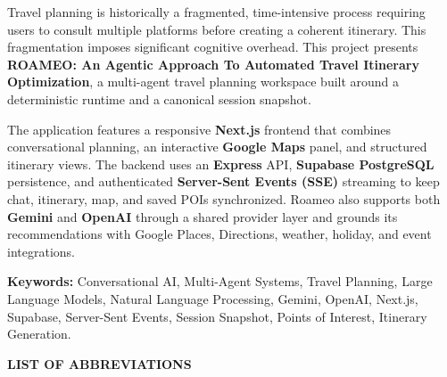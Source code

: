 \documentclass[12pt,a4paper]{report}
\begin{document}
Travel planning is historically a fragmented, time-intensive process requiring users to consult multiple platforms before creating a coherent itinerary. This fragmentation imposes significant cognitive overhead. This project presents \textbf{ROAMEO: An Agentic Approach To Automated Travel Itinerary Optimization}, a multi-agent travel planning workspace built around a deterministic runtime and a canonical session snapshot.

The application features a responsive \textbf{Next.js} frontend that combines conversational planning, an interactive \textbf{Google Maps} panel, and structured itinerary views. The backend uses an \textbf{Express} API, \textbf{Supabase PostgreSQL} persistence, and authenticated \textbf{Server-Sent Events (SSE)} streaming to keep chat, itinerary, map, and saved POIs synchronized. Roameo also supports both \textbf{Gemini} and \textbf{OpenAI} through a shared provider layer and grounds its recommendations with Google Places, Directions, weather, holiday, and event integrations.

\vspace{0.5cm}
\noindent\textbf{Keywords:} Conversational AI, Multi-Agent Systems, Travel Planning, Large Language Models, Natural Language Processing, Gemini, OpenAI, Next.js, Supabase, Server-Sent Events, Session Snapshot, Points of Interest, Itinerary Generation.



\clearpage
\tableofcontents
\clearpage
\listoffigures
\clearpage
\listoftables
\clearpage


\clearpage
{}
\begin{center}{\LARGE\bfseries LIST OF ABBREVIATIONS}\end{center}
\vspace{0.5cm}
\end{document}
